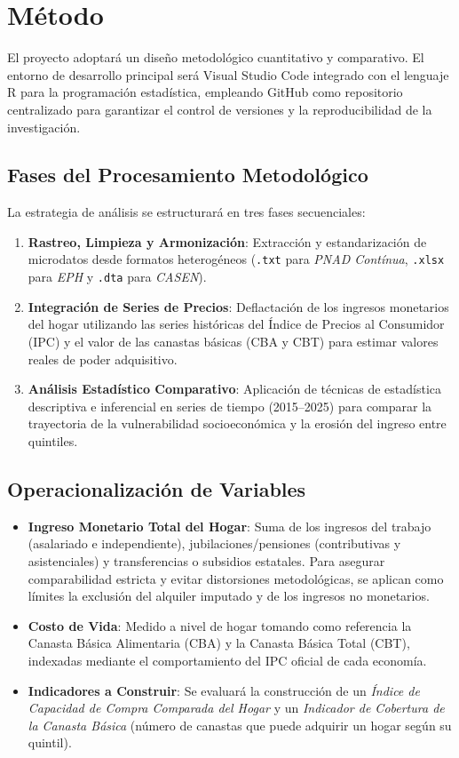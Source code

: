 \section{Método}

El proyecto adoptará un diseño metodológico cuantitativo y comparativo. El entorno de desarrollo principal será Visual Studio Code integrado con el lenguaje R para la programación estadística, empleando GitHub como repositorio centralizado para garantizar el control de versiones y la reproducibilidad de la investigación.

\subsection{Fases del Procesamiento Metodológico}
La estrategia de análisis se estructurará en tres fases secuenciales:
\begin{enumerate}
    \item \textbf{Rastreo, Limpieza y Armonización}: Extracción y estandarización de microdatos desde formatos heterogéneos (\texttt{.txt} para \textit{PNAD Contínua}, \texttt{.xlsx} para \textit{EPH} y \texttt{.dta} para \textit{CASEN}).
    \item \textbf{Integración de Series de Precios}: Deflactación de los ingresos monetarios del hogar utilizando las series históricas del Índice de Precios al Consumidor (IPC) y el valor de las canastas básicas (CBA y CBT) para estimar valores reales de poder adquisitivo.
    \item \textbf{Análisis Estadístico Comparativo}: Aplicación de técnicas de estadística descriptiva e inferencial en series de tiempo (2015--2025) para comparar la trayectoria de la vulnerabilidad socioeconómica y la erosión del ingreso entre quintiles.
\end{enumerate}

\subsection{Operacionalización de Variables}
\begin{itemize}
    \item \textbf{Ingreso Monetario Total del Hogar}: Suma de los ingresos del trabajo (asalariado e independiente), jubilaciones/pensiones (contributivas y asistenciales) y transferencias o subsidios estatales. Para asegurar comparabilidad estricta y evitar distorsiones metodológicas, se aplican como límites la exclusión del alquiler imputado y de los ingresos no monetarios.
    \item \textbf{Costo de Vida}: Medido a nivel de hogar tomando como referencia la Canasta Básica Alimentaria (CBA) y la Canasta Básica Total (CBT), indexadas mediante el comportamiento del IPC oficial de cada economía.
    \item \textbf{Indicadores a Construir}: Se evaluará la construcción de un \textit{Índice de Capacidad de Compra Comparada del Hogar} y un \textit{Indicador de Cobertura de la Canasta Básica} (número de canastas que puede adquirir un hogar según su quintil).
\end{itemize}

